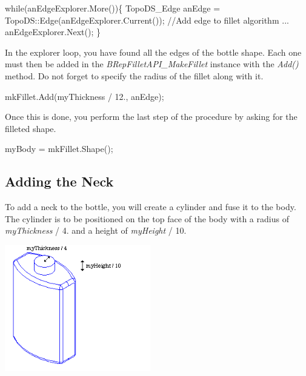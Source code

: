 \begin{DoxyCode}
\textcolor{keywordflow}{while}(anEdgeExplorer.More())\{
    TopoDS\_Edge anEdge = TopoDS::Edge(anEdgeExplorer.Current());
    \textcolor{comment}{//Add edge to fillet algorithm}
    ...
    anEdgeExplorer.Next();
\}
\end{DoxyCode}


In the explorer loop, you have found all the edges of the bottle shape. Each one must then be added in the {\itshape B\+Rep\+Fillet\+A\+P\+I\+\_\+\+Make\+Fillet} instance with the {\itshape Add()} method. Do not forget to specify the radius of the fillet along with it.


\begin{DoxyCode}
mkFillet.Add(myThickness / 12., anEdge);
\end{DoxyCode}


Once this is done, you perform the last step of the procedure by asking for the filleted shape.


\begin{DoxyCode}
myBody = mkFillet.Shape();
\end{DoxyCode}
\hypertarget{occt__tutorial_OCCT_TUTORIAL_SUB3_3}{}\subsection{Adding the Neck}\label{occt__tutorial_OCCT_TUTORIAL_SUB3_3}
To add a neck to the bottle, you will create a cylinder and fuse it to the body. The cylinder is to be positioned on the top face of the body with a radius of {\itshape my\+Thickness} / 4. and a height of {\itshape my\+Height} / 10.


\begin{DoxyImageNoCaption}
\begin{center}
   \mbox{\includegraphics[width=240]{tutorial_image009.png}}
\end{center}
\end{DoxyImageNoCaption}


